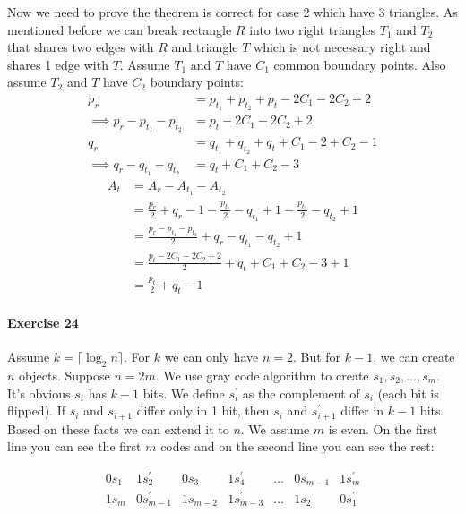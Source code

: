 \documentclass{book}
\begin{document}
	Now we need to prove the theorem is correct for case 2 which have 3 triangles. As mentioned before we can break rectangle $R$ into two right triangles $T_1$ and $T_2$ that shares two edges with $R$ and triangle $T$ which is not necessary right and shares 1 edge with $T$. Assume $T_1$ and $T$ have $C_1$ common boundary points. Also assume $T_2$ and $T$ have $C_2$ boundary points:
	\begin{equation*}
		\begin{split}
			p_r &= p_{t_1} + p_{t_2} + p_t - 2C_1 - 2C_2 + 2 \\
			\implies p_r - p_{t_1} - p_{t_2} &= p_t - 2C_1 - 2C_2 + 2 \\
			q_r &= q_{t_1} + q_{t_2} + q_t + C_1 - 2 + C_2 - 1 \\
			\implies q_r - q_{t_1} - q_{t_2} &= q_t + C_1 + C_2 - 3
		\end{split}
	\end{equation*}
	\begin{equation*}
		\begin{split}
			A_t &= A_r - A_{t_1} - A_{t_2} \\
			&= \frac{p_r}{2} + q_r - 1 - \frac{p_{t_1}}{2} - q_{t_1} + 1 - \frac{p_{t_2}}{2} - q_{t_2} + 1 \\
			&= \frac{p_r - p_{t_1} - p_{t_2}}{2} + q_r - q_{t_1} - q_{t_2} + 1 \\
			&= \frac{p_t - 2C_1 - 2C_2 + 2}{2} + q_t + C_1 + C_2 - 3 + 1 \\
			&= \frac{p_t}{2} + q_t - 1
		\end{split}
	\end{equation*}
	\paragraph{Exercise 24}
	Assume $k = \lceil \log_2 n \rceil$. For $k$ we can only have $n = 2$. But for $k - 1$, we can create $n$ objects. Suppose $n = 2m$. We use gray code algorithm to create $s_1, s_2, \dots, s_m$. It's obvious $s_i$ has $k - 1$ bits. We define $s_i^\prime$ as the complement of $s_i$ (each bit is flipped). If $s_i$ and $s_{i + 1}$ differ only in 1 bit, then $s_i$ and $s_{i + 1}^\prime$ differ in $k - 1$ bits. Based on these facts we can extend it to $n$. We assume $m$ is even. On the first line you can see the first $m$ codes and on the second line you can see the rest:
	
	\begin{equation*}
		\begin{matrix}
			0s_1 & 1s_2^\prime & 0s_3 & 1s_4^\prime & \dots & 0s_{m - 1} & 1s_m^\prime \\
			1s_m & 0s_{m - 1}^\prime & 1s_{m - 2} & 1s_{m - 3}^\prime & \dots & 1s_2 & 0s_1^\prime
		\end{matrix}
	\end{equation*}
	
\end{document}
